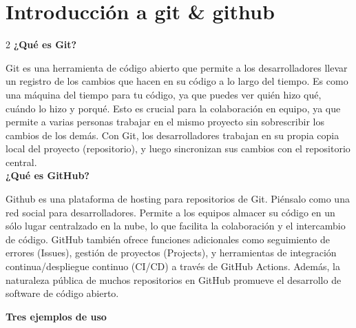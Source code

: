 \chapter{Introducción a git \& github}
\minitoc%

\begin{justify}
	\begin{multicols}{2}		
		{\bf ¿Qué es Git?}
		
		Git es una herramienta de código abierto que permite a los desarrolladores llevar
		un registro de los cambios que hacen en su código a lo largo del tiempo. Es como
		una máquina del tiempo para tu código, ya que puedes ver quién hizo qué, cuándo
		lo hizo y porqué. Esto es crucial para la colaboración en equipo, ya que permite
		a varias personas trabajar en el mismo proyecto sin sobrescribir los cambios de los
		demás. Con Git, los desarrolladores trabajan en su propia copia local del proyecto
		(repositorio), y luego sincronizan sus cambios con el repositorio central.\\
		
		{\bf ¿Qué es GitHub?}
		
		Github es una plataforma de hosting para repositorios de Git. Piénsalo como una red social
		para desarrolladores. Permite a los equipos almacer su código en un sólo lugar centralzado
		en la nube, lo que facilita la colaboración y el intercambio de código. GitHub también 
		ofrece funciones adicionales como seguimiento de errores (Issues), gestión de proyectos
		(Projects), y herramientas de integración continua/despliegue continuo (CI/CD) a través 
		de GitHub Actions. 
		Además, la naturaleza pública de muchos repositorios en GitHub promueve el desarrollo de 
		software de código abierto.
	\end{multicols}
\end{justify}


{\bf Tres ejemplos de uso}

